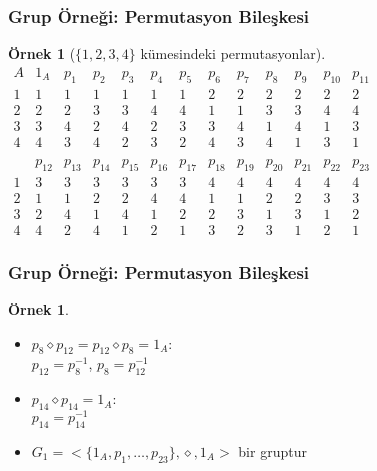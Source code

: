 \documentclass[dvipsnames]{beamer}
\theoremstyle{definition}
\theoremstyle{example}
\newtheorem{ornek}[theorem]{Örnek}
\theoremstyle{plain}
\begin{document}
\begin{frame}
  \frametitle{Grup Örneği: Permutasyon Bileşkesi}

  \begin{ornek}[$\{1,2,3,4\}$ kümesindeki permutasyonlar]
    $\begin{array}{c|cccccccccccccccccccccccc}
        A & 1_{A}  & p_{1}  & p_{2}  & p_{3}  & p_{4}  & p_{5}
          & p_{6}  & p_{7}  & p_{8}  & p_{9}  & p_{10} & p_{11}\\\hline
        1 &   1    &   1    &   1    &   1    &   1    &  1
          &   2    &   2    &   2    &   2    &   2    &  2\\
        2 &   2    &   2    &   3    &   3    &   4    &  4
          &   1    &   1    &   3    &   3    &   4    &  4\\
        3 &   3    &   4    &   2    &   4    &   2    &  3
          &   3    &   4    &   1    &   4    &   1    &  3\\
        4 &   4    &   3    &   4    &   2    &   3    &  2
          &   4    &   3    &   4    &   1    &   3    &  1\\\\
          & p_{12} & p_{13} & p_{14} & p_{15} & p_{16} & p_{17}
          & p_{18} & p_{19} & p_{20} & p_{21} & p_{22} & p_{23}\\\hline
        1 &   3    &   3    &   3    &   3    &   3    &  3
          &   4    &   4    &   4    &   4    &   4    &  4\\
        2 &   1    &   1    &   2    &   2    &   4    &  4
          &   1    &   1    &   2    &   2    &   3    &  3\\
        3 &   2    &   4    &   1    &   4    &   1    &  2
          &   2    &   3    &   1    &   3    &   1    &  2\\
        4 &   4    &   2    &   4    &   1    &   2    &  1
          &   3    &   2    &   3    &   1    &   2    &  1
      \end{array}$
  \end{ornek}
\end{frame}

\begin{frame}
  \frametitle{Grup Örneği: Permutasyon Bileşkesi}

  \begin{ornek}
    \begin{itemize}
      \item $p_8 \diamond p_{12}=p_{12} \diamond p_8=1_A$:\\
        $p_{12} = p_8^{-1}$, $p_8 = p_{12}^{-1}$
      \item $p_{14} \diamond p_{14}=1_A$:\\
        $p_{14} = p_{14}^{-1}$

      \pause
      \bigskip
      \item $G_1=<\{1_A,p_1,\dots,p_{23}\},\diamond,1_A>$ bir gruptur
    \end{itemize}
  \end{ornek}
\end{frame}
\end{document}
